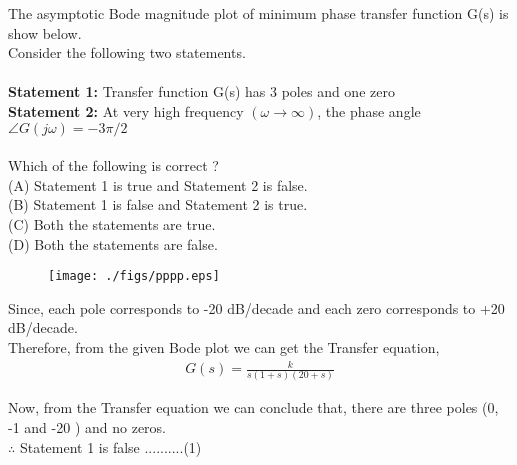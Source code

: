 
\item 
The asymptotic Bode magnitude plot of  minimum phase transfer function
G(s) is show below.\\

Consider the following two statements.\\ \\
 \textbf{Statement 1:} Transfer function G(s) has 3 poles and one zero \\
 \textbf{ Statement 2:} At very high frequency $(\omega \to \infty)$, the phase angle $ \angle G(j\omega)=-3\pi/2$ \\ \\
Which of the following is correct ? \\
(A) Statement 1 is true and Statement 2 is false.\\
(B) Statement 1 is false and Statement 2 is true.\\
(C) Both the statements are true.\\
(D) Both the statements are false.\\
\begin{figure}[htp]
	\centering
	\texttt{[image: ./figs/pppp.eps]}
	\caption{}
	\label{fig:galaxy}
\end{figure} 

\solution

Since, each pole corresponds to -20 dB/decade  
and each zero corresponds to +20 dB/decade.\\
Therefore, from the given Bode plot we can get the Transfer equation,
\begin{align}
G(s) = \frac{k}{s(1+s)(20+s)}
\end{align}

Now, from the Transfer equation we can conclude that,
there are three poles (0, -1 and -20 ) and no zeros.\\

$\therefore$ Statement 1 is false  ..........(1)


